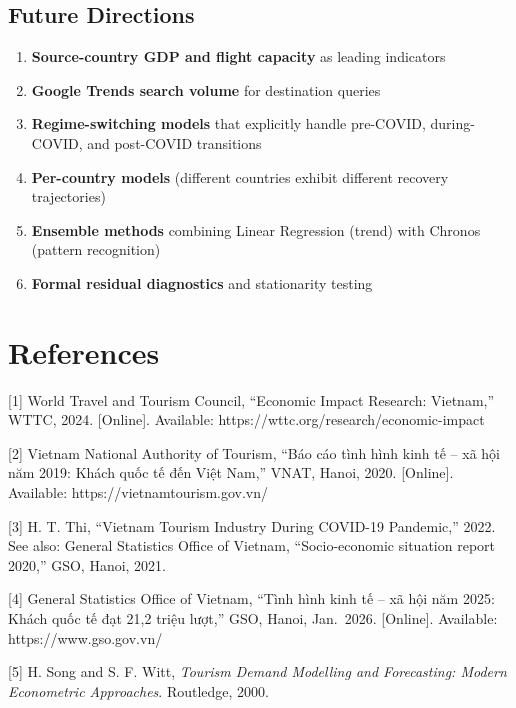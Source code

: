 \documentclass[
]{article}
\providecommand{\tightlist}{%
  \setlength{\itemsep}{0pt}\setlength{\parskip}{0pt}}
\begin{document}
\subsection{Future Directions}\label{future-directions}

\begin{enumerate}
\def\labelenumi{\arabic{enumi}.}
\tightlist
\item
  \textbf{Source-country GDP and flight capacity} as leading indicators
\item
  \textbf{Google Trends search volume} for destination queries
\item
  \textbf{Regime-switching models} that explicitly handle pre-COVID,
  during-COVID, and post-COVID transitions
\item
  \textbf{Per-country models} (different countries exhibit different
  recovery trajectories)
\item
  \textbf{Ensemble methods} combining Linear Regression (trend) with
  Chronos (pattern recognition)
\item
  \textbf{Formal residual diagnostics} and stationarity testing
\end{enumerate}

\newpage

\section{References}\label{references}

{[}1{]} World Travel and Tourism Council, ``Economic Impact Research:
Vietnam,'' WTTC, 2024. {[}Online{]}. Available:
https://wttc.org/research/economic-impact

{[}2{]} Vietnam National Authority of Tourism, ``Báo cáo tình hình kinh
tế -- xã hội năm 2019: Khách quốc tế đến Việt Nam,'' VNAT, Hanoi, 2020.
{[}Online{]}. Available: https://vietnamtourism.gov.vn/

{[}3{]} H. T. Thi, ``Vietnam Tourism Industry During COVID-19
Pandemic,'' 2022. See also: General Statistics Office of Vietnam,
``Socio-economic situation report 2020,'' GSO, Hanoi, 2021.

{[}4{]} General Statistics Office of Vietnam, ``Tình hình kinh tế -- xã
hội năm 2025: Khách quốc tế đạt 21,2 triệu lượt,'' GSO, Hanoi,
Jan.~2026. {[}Online{]}. Available: https://www.gso.gov.vn/

{[}5{]} H. Song and S. F. Witt, \emph{Tourism Demand Modelling and
Forecasting: Modern Econometric Approaches}. Routledge, 2000.
\end{document}
